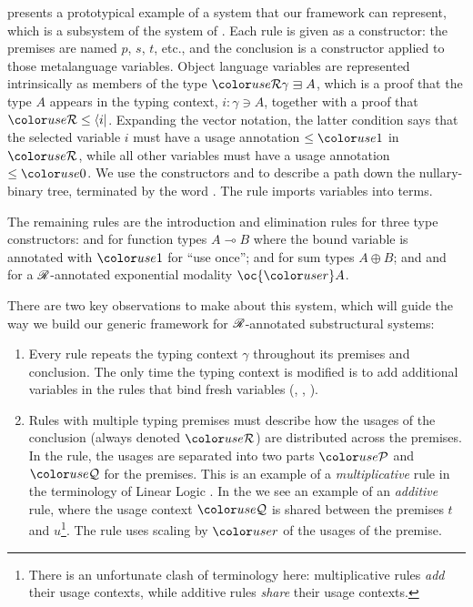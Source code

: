  presents a prototypical example of a system that our
framework can represent, which is a subsystem of the \name{} system of
\citet{WA20}. Each rule is given as a constructor: the premises are
named $p$, $s$, $t$, etc., and the conclusion is a constructor applied
to those metalanguage variables.
Object language variables are represented intrinsically as members
of the type $\grR\gamma \sqni A$, which is a proof that the type $A$
appears in the typing context, $i : \gamma \ni A$, together with a
proof that $\grR \leq \langle i \rvert$.  Expanding the vector
notation, the latter condition says that the selected variable $i$
must have a usage annotation $\leq \gr1$ in $\grR$, while all other
variables must have a usage annotation $\leq \gr0$.
We use the constructors \AgdaInductiveConstructor{$\swarrow$} and
\AgdaInductiveConstructor{$\searrow$} to describe a path down the
nullary-binary tree, terminated by the word
.
The  rule imports variables into terms.

The remaining rules are the introduction and elimination rules for
three type constructors:  and
 for function types $A \multimap B$ where
the bound variable is annotated with $\gr 1$ for ``use once'';
 and  for
sum types $A \oplus B$; and  and
 for a $\mathscr R$-annotated exponential
modality $\oc{\gr r} A$.

There are two key observations to make about this system, which will
guide the way we build our generic framework for $\mathscr R$-annotated
substructural systems:
\begin{enumerate}
\item Every rule repeats the typing context $\gamma$ throughout its
  premises and conclusion. The only time the typing context is
  modified is to add additional variables in the rules that bind fresh
  variables (,
  , ).
\item Rules with multiple typing premises must describe how the
  usages of the conclusion (always denoted $\grR$) are distributed
  across the premises. In the  rule, the
  usages are separated into two parts $\grP$ and $\grQ$ for the
  premises. This is an example of a \emph{multiplicative} rule in the
  terminology of Linear Logic \cite{girard87linear}. In the
   we see an example of an
  \emph{additive} rule, where the usage context $\grQ$ is shared
  between the premises $t$ and $u$\footnote{There is an unfortunate
    clash of terminology here: multiplicative rules \emph{add} their
    usage contexts, while additive rules \emph{share} their
    usage contexts.}. The  rule uses scaling
  by $\gr r$ of the usages of the premise.
\end{enumerate}

